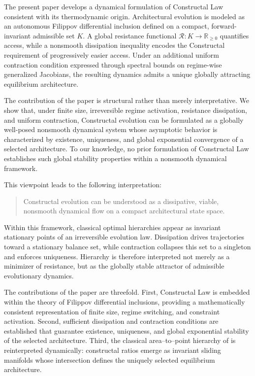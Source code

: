 \documentclass[12pt]{article}
\theoremstyle{plain}
\theoremstyle{definition}
\theoremstyle{remark}
\begin{document}
The present paper develops a dynamical formulation of Constructal Law consistent with its thermodynamic origin. Architectural evolution is modeled as an autonomous Filippov differential inclusion defined on a compact, forward-invariant admissible set $K$. A global resistance functional $\mathcal{R}:K\to\mathbb{R}_{\ge 0}$ quantifies access, while a nonsmooth dissipation inequality encodes the Constructal requirement of progressively easier access. Under an additional uniform contraction condition expressed through spectral bounds on regime-wise generalized Jacobians, the resulting dynamics admits a unique globally attracting equilibrium architecture.

The contribution of the paper is structural rather than merely interpretative. We show that, under finite size, irreversible regime activation, resistance dissipation, and uniform contraction, Constructal evolution can be formulated as a globally well-posed nonsmooth dynamical system whose asymptotic behavior is characterized by existence, uniqueness, and global exponential convergence of a selected architecture. To our knowledge, no prior formulation of Constructal Law establishes such global stability properties within a nonsmooth dynamical framework.

This viewpoint leads to the following interpretation:

\begin{quote}
Constructal evolution can be understood as a dissipative, viable, nonsmooth dynamical flow on a compact architectural state space.
\end{quote}

Within this framework, classical optimal hierarchies appear as invariant stationary points of an irreversible evolution law. Dissipation drives trajectories toward a stationary balance set, while contraction collapses this set to a singleton and enforces uniqueness. Hierarchy is therefore interpreted not merely as a minimizer of resistance, but as the globally stable attractor of admissible evolutionary dynamics.

The contributions of the paper are threefold. First, Constructal Law is embedded within the theory of Filippov differential inclusions, providing a mathematically consistent representation of finite size, regime switching, and constraint activation. Second, sufficient dissipation and contraction conditions are established that guarantee existence, uniqueness, and global exponential stability of the selected architecture. Third, the classical area--to--point hierarchy of \cite{BejanBadescuDeVos2000AE,BejanBadescuDeVos2000ECM} is reinterpreted dynamically: constructal ratios emerge as invariant sliding manifolds whose intersection defines the uniquely selected equilibrium architecture.
\end{document}
